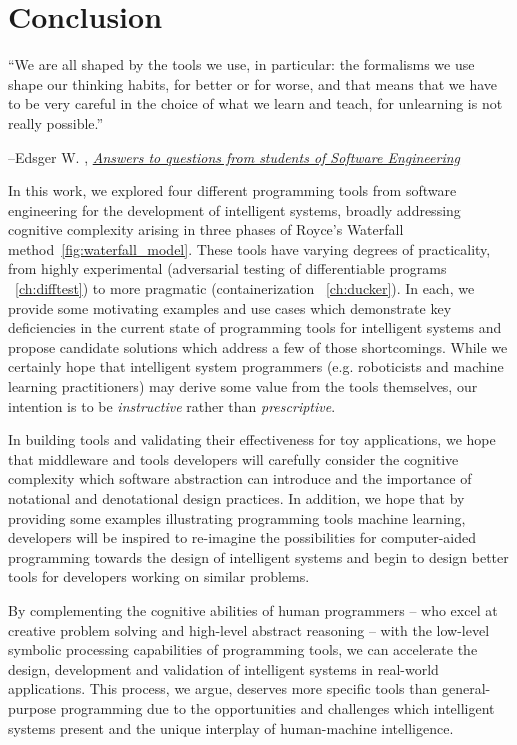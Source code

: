 \usepackage{hyperref}

\chapter{Conclusion}\label{ch:conclusion}
\setlength{\epigraphwidth}{0.90\textwidth}
\epigraph{``We are all shaped by the tools we use, in particular: the formalisms we use shape our thinking habits, for better or for worse, and that means that we have to be very careful in the choice of what we learn and teach, for unlearning is not really possible.''}{\begin{flushright}--Edsger W. \citet{dijkstra2000answers}, \href{https://www.cs.utexas.edu/~EWD/transcriptions/EWD13xx/EWD1305.html}{\textit{Answers to questions from students of Software Engineering}}\end{flushright}}

In this work, we explored four different programming tools from software engineering for the development of intelligent systems, broadly addressing cognitive complexity arising in three phases of Royce's Waterfall method~\autoref{fig:waterfall_model}. These tools have varying degrees of practicality, from highly experimental (adversarial testing of differentiable programs ~\autoref{ch:difftest}) to more pragmatic (containerization ~\autoref{ch:ducker}). In each, we provide some motivating examples and use cases which demonstrate key deficiencies in the current state of programming tools for intelligent systems and propose candidate solutions which address a few of those shortcomings. While we certainly hope that intelligent system programmers (e.g. roboticists and machine learning practitioners) may derive some value from the tools themselves, our intention is to be \textit{instructive} rather than \textit{prescriptive}.

In building tools and validating their effectiveness for toy applications, we hope that middleware and tools developers will carefully consider the cognitive complexity which software abstraction can introduce and the importance of notational and denotational design practices. In addition, we hope that by providing some examples illustrating programming tools machine learning, developers will be inspired to re-imagine the possibilities for computer-aided programming towards the design of intelligent systems and begin to design better tools for developers working on similar problems.

By complementing the cognitive abilities of human programmers -- who excel at creative problem solving and high-level abstract reasoning -- with the low-level symbolic processing capabilities of programming tools, we can accelerate the design, development and validation of intelligent systems in real-world applications. This process, we argue, deserves more specific tools than general-purpose programming due to the opportunities and challenges which intelligent systems present and the unique interplay of human-machine intelligence.

